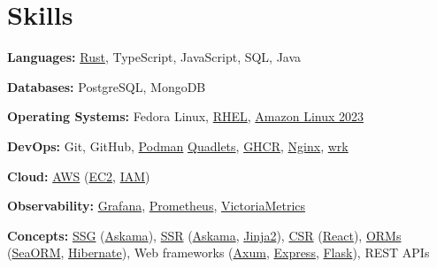 \section{Skills}

\textbf{Languages:} \href{https://rust-lang.org/}{Rust}, TypeScript, JavaScript, SQL, Java

\textbf{Databases:} PostgreSQL, MongoDB

\textbf{Operating Systems:} Fedora Linux, \href{https://www.redhat.com/en/technologies/linux-platforms/enterprise-linux}{RHEL}, \href{https://aws.amazon.com/linux/amazon-linux-2023/}{Amazon Linux 2023}

\textbf{DevOps:} Git, GitHub, \href{https://www.redhat.com/en/topics/containers/what-is-podman}{Podman} \href{https://docs.podman.io/en/latest/markdown/podman-quadlet.1.html}{Quadlets}, \href{https://docs.github.com/en/packages/working-with-a-github-packages-registry/working-with-the-container-registry}{GHCR}, \href{https://nginx.org/}{Nginx}, \href{https://github.com/wg/wrk}{wrk}

\textbf{Cloud:} \href{https://aws.amazon.com/what-is-aws/}{AWS} (\href{https://docs.aws.amazon.com/AWSEC2/latest/UserGuide/concepts.html}{EC2}, \href{https://docs.aws.amazon.com/IAM/latest/UserGuide/introduction.html}{IAM})

\textbf{Observability:} \href{https://grafana.com/}{Grafana}, \href{https://prometheus.io/}{Prometheus}, \href{https://victoriametrics.com/}{VictoriaMetrics}

\textbf{Concepts:} \href{https://developer.mozilla.org/en-US/docs/Glossary/SSG}{SSG} (\href{https://docs.rs/askama/latest/askama/}{Askama}), \href{https://developer.mozilla.org/en-US/docs/Glossary/SSR}{SSR} (\href{https://docs.rs/askama/latest/askama/}{Askama}, \href{https://pypi.org/project/Jinja2/}{Jinja2}), \href{https://developer.mozilla.org/en-US/docs/Glossary/CSR}{CSR} (\href{https://react.dev/}{React}), \href{https://aws.amazon.com/what-is/object-relational-mapping/}{ORMs} (\href{https://www.sea-ql.org/SeaORM/}{SeaORM}, \href{https://hibernate.org/}{Hibernate}), Web frameworks (\href{https://docs.rs/axum/latest/axum/}{Axum}, \href{https://expressjs.com/}{Express}, \href{https://flask.palletsprojects.com/en/stable/}{Flask}), REST APIs